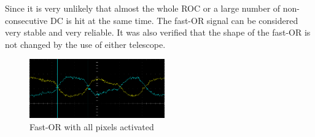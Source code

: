 \documentclass[british,11pt,a4paper]{memoir}
\begin{document}
Since it is very unlikely that almost the whole \ac{ROC} or a large number of non-consecutive \ac{DC} is hit at the same time. The fast-OR signal can be considered very stable and very reliable. It was also verified that the shape of the fast-OR is not changed by the use of either telescope.
\begin{figure}[ht]
	\centering
	\includegraphics[width=0.52\textwidth]{fastOR/a1}
	\caption{Fast-OR with all pixels activated}
	\label{pallfast}
\end{figure}\no
\end{document}
